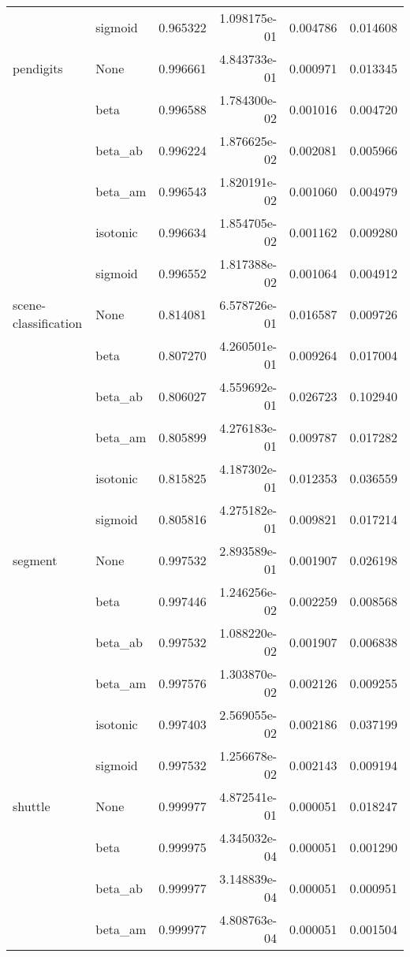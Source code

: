 \begin{tabular}{llrrrr}
        & sigmoid &  0.965322 &  1.098175e-01 &  0.004786 &  0.014608 \\
pendigits & None &  0.996661 &  4.843733e-01 &  0.000971 &  0.013345 \\
        & beta &  0.996588 &  1.784300e-02 &  0.001016 &  0.004720 \\
        & beta\_ab &  0.996224 &  1.876625e-02 &  0.002081 &  0.005966 \\
        & beta\_am &  0.996543 &  1.820191e-02 &  0.001060 &  0.004979 \\
        & isotonic &  0.996634 &  1.854705e-02 &  0.001162 &  0.009280 \\
        & sigmoid &  0.996552 &  1.817388e-02 &  0.001064 &  0.004912 \\
scene-classification & None &  0.814081 &  6.578726e-01 &  0.016587 &  0.009726 \\
        & beta &  0.807270 &  4.260501e-01 &  0.009264 &  0.017004 \\
        & beta\_ab &  0.806027 &  4.559692e-01 &  0.026723 &  0.102940 \\
        & beta\_am &  0.805899 &  4.276183e-01 &  0.009787 &  0.017282 \\
        & isotonic &  0.815825 &  4.187302e-01 &  0.012353 &  0.036559 \\
        & sigmoid &  0.805816 &  4.275182e-01 &  0.009821 &  0.017214 \\
segment & None &  0.997532 &  2.893589e-01 &  0.001907 &  0.026198 \\
        & beta &  0.997446 &  1.246256e-02 &  0.002259 &  0.008568 \\
        & beta\_ab &  0.997532 &  1.088220e-02 &  0.001907 &  0.006838 \\
        & beta\_am &  0.997576 &  1.303870e-02 &  0.002126 &  0.009255 \\
        & isotonic &  0.997403 &  2.569055e-02 &  0.002186 &  0.037199 \\
        & sigmoid &  0.997532 &  1.256678e-02 &  0.002143 &  0.009194 \\
shuttle & None &  0.999977 &  4.872541e-01 &  0.000051 &  0.018247 \\
        & beta &  0.999975 &  4.345032e-04 &  0.000051 &  0.001290 \\
        & beta\_ab &  0.999977 &  3.148839e-04 &  0.000051 &  0.000951 \\
        & beta\_am &  0.999977 &  4.808763e-04 &  0.000051 &  0.001504 \\

\end{tabular}
